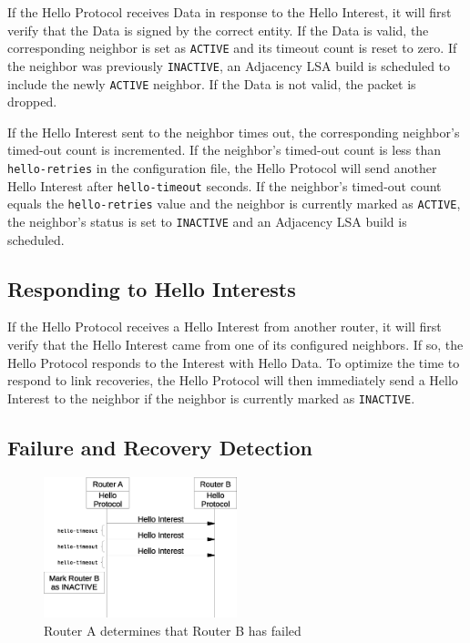 If the Hello Protocol receives Data in response to the Hello Interest, it will first verify that the Data is signed by the correct entity.
If the Data is valid, the corresponding neighbor is set as \texttt{ACTIVE} and its timeout count is reset to zero.
If the neighbor was previously \texttt{INACTIVE}, an Adjacency LSA build is scheduled to include the newly \texttt{ACTIVE} neighbor.
If the Data is not valid, the packet is dropped.

If the Hello Interest sent to the neighbor times out, the corresponding neighbor's timed-out count is incremented.
If the neighbor's timed-out count is less than \texttt{hello-retries} in the configuration file, the Hello Protocol will send another Hello Interest after \texttt{hello-timeout} seconds.
If the neighbor's timed-out count equals the \texttt{hello-retries} value and the neighbor is currently marked as \texttt{ACTIVE}, the neighbor's status is set to \texttt{INACTIVE} and an Adjacency LSA build is scheduled. 

\subsection{Responding to Hello Interests}
\label{sec:respond-to-hello}

If the Hello Protocol receives a Hello Interest from another router, it will first verify that the Hello Interest came from one of its configured neighbors.
If so, the Hello Protocol responds to the Interest with Hello Data.
To optimize the time to respond to link recoveries, the Hello Protocol will then immediately send a Hello Interest to the neighbor if the neighbor is currently marked as \texttt{INACTIVE}.

\subsection{Failure and Recovery Detection}
\label{sec:link-failure}

\begin{figure}
\center
\includegraphics[width=0.5\textwidth]{figures/hello-protocol-timeout}
\caption{Router A determines that Router B has failed}
\end{figure}

